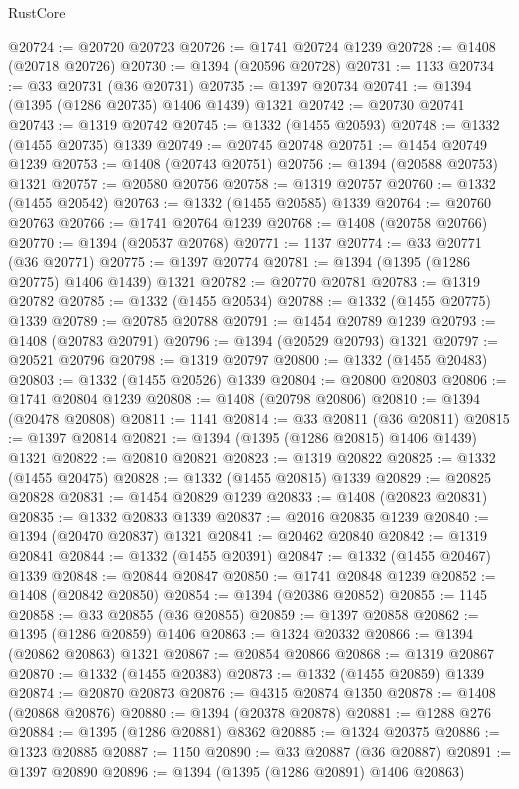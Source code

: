 \begin{lexlean}{RustCore}
\begin{coremodule}
@20724 := @20720 @20723
@20726 := @1741 @20724 @1239
@20728 := @1408 (@20718 @20726)
@20730 := @1394 (@20596 @20728)
@20731 := 1133
@20734 := @33 @20731 (@36 @20731)
@20735 := @1397 @20734
@20741 := @1394 (@1395 (@1286 @20735) @1406 @1439) @1321
@20742 := @20730 @20741
@20743 := @1319 @20742
@20745 := @1332 (@1455 @20593)
@20748 := @1332 (@1455 @20735) @1339
@20749 := @20745 @20748
@20751 := @1454 @20749 @1239
@20753 := @1408 (@20743 @20751)
@20756 := @1394 (@20588 @20753) @1321
@20757 := @20580 @20756
@20758 := @1319 @20757
@20760 := @1332 (@1455 @20542)
@20763 := @1332 (@1455 @20585) @1339
@20764 := @20760 @20763
@20766 := @1741 @20764 @1239
@20768 := @1408 (@20758 @20766)
@20770 := @1394 (@20537 @20768)
@20771 := 1137
@20774 := @33 @20771 (@36 @20771)
@20775 := @1397 @20774
@20781 := @1394 (@1395 (@1286 @20775) @1406 @1439) @1321
@20782 := @20770 @20781
@20783 := @1319 @20782
@20785 := @1332 (@1455 @20534)
@20788 := @1332 (@1455 @20775) @1339
@20789 := @20785 @20788
@20791 := @1454 @20789 @1239
@20793 := @1408 (@20783 @20791)
@20796 := @1394 (@20529 @20793) @1321
@20797 := @20521 @20796
@20798 := @1319 @20797
@20800 := @1332 (@1455 @20483)
@20803 := @1332 (@1455 @20526) @1339
@20804 := @20800 @20803
@20806 := @1741 @20804 @1239
@20808 := @1408 (@20798 @20806)
@20810 := @1394 (@20478 @20808)
@20811 := 1141
@20814 := @33 @20811 (@36 @20811)
@20815 := @1397 @20814
@20821 := @1394 (@1395 (@1286 @20815) @1406 @1439) @1321
@20822 := @20810 @20821
@20823 := @1319 @20822
@20825 := @1332 (@1455 @20475)
@20828 := @1332 (@1455 @20815) @1339
@20829 := @20825 @20828
@20831 := @1454 @20829 @1239
@20833 := @1408 (@20823 @20831)
@20835 := @1332 @20833 @1339
@20837 := @2016 @20835 @1239
@20840 := @1394 (@20470 @20837) @1321
@20841 := @20462 @20840
@20842 := @1319 @20841
@20844 := @1332 (@1455 @20391)
@20847 := @1332 (@1455 @20467) @1339
@20848 := @20844 @20847
@20850 := @1741 @20848 @1239
@20852 := @1408 (@20842 @20850)
@20854 := @1394 (@20386 @20852)
@20855 := 1145
@20858 := @33 @20855 (@36 @20855)
@20859 := @1397 @20858
@20862 := @1395 (@1286 @20859) @1406
@20863 := @1324 @20332
@20866 := @1394 (@20862 @20863) @1321
@20867 := @20854 @20866
@20868 := @1319 @20867
@20870 := @1332 (@1455 @20383)
@20873 := @1332 (@1455 @20859) @1339
@20874 := @20870 @20873
@20876 := @4315 @20874 @1350
@20878 := @1408 (@20868 @20876)
@20880 := @1394 (@20378 @20878)
@20881 := @1288 @276
@20884 := @1395 (@1286 @20881) @8362
@20885 := @1324 @20375
@20886 := @1323 @20885
@20887 := 1150
@20890 := @33 @20887 (@36 @20887)
@20891 := @1397 @20890
@20896 := @1394 (@1395 (@1286 @20891) @1406 @20863)

\end{coremodule}
\end{lexlean}

